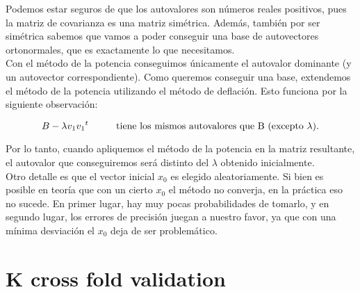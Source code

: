 Podemos estar seguros de que los autovalores son números reales positivos, pues la matriz de covarianza es una matriz simétrica. Además, también por ser simétrica sabemos que vamos a poder conseguir una base de autovectores ortonormales, que es exactamente lo que necesitamos. \\

Con el método de la potencia conseguimos únicamente el autovalor dominante (y un autovector correspondiente). Como queremos conseguir una base, extendemos el método de la potencia utilizando el método de deflación. Esto funciona por la siguiente observación:

$$ B - \lambda v_1 {v_1}^{t} \text{\hspace{1cm}tiene los mismos autovalores que B (excepto $\lambda$).} $$

Por lo tanto, cuando apliquemos el método de la potencia en la matriz resultante, el autovalor que conseguiremos será distinto del $\lambda$ obtenido inicialmente. \\

Otro detalle es que el vector inicial $x_0$ es elegido aleatoriamente. Si bien es posible en teoría que con un cierto $x_0$ el método no converja, en la práctica eso no sucede. En primer lugar, hay muy pocas probabilidades de tomarlo, y en segundo lugar, los errores de precisión juegan a nuestro favor, ya que con una mínima desviación el $x_0$ deja de ser problemático. \\






\section{K cross fold validation}






